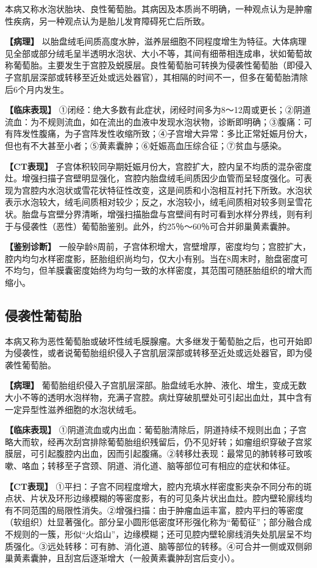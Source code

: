 本病又称水泡状胎块、良性葡萄胎。其病因及本质尚不明确，一种观点认为是肿瘤性疾病，另一种观点认为是胎儿发育障碍死亡后所致。

\textbf{【病理】}
以胎盘绒毛间质高度水肿，滋养层细胞不同程度增生为特征。大体病理见全部或部分绒毛呈半透明水泡状、大小不等，其间有细蒂相连成串，状如葡萄故称葡萄胎。主要发生于宫腔及蜕膜层。良性葡萄胎可转换为侵袭性葡萄胎（即侵入子宫肌层深部或转移至近处或远处器官），其相隔的时间不一，但多在葡萄胎清除后6个月内发生。

\textbf{【临床表现】}
①闭经：绝大多数有此症状，闭经时间多为8～12周或更长；②阴道流血：为不规则流血，如在流出的血液中发现水泡状物，诊断即明确；③腹痛：可有阵发性腹痛，为子宫阵发性收缩所致；④子宫增大异常：多比正常妊娠月份大，但也有不大甚至小者；⑤黄素囊肿；⑥妊娠高血压综合征；⑦贫血与感染。

\textbf{【CT表现】}
子宫体积较同孕期妊娠月份大，宫腔扩大，腔内呈不均质的混杂密度灶。增强扫描子宫壁明显强化，宫腔内胎盘绒毛间质因少血管而呈轻度强化。可表现为宫腔内水泡状或雪花状特征性改变，这是间质和小泡相互衬托下所致。水泡状表示水泡较大，绒毛间质相对较少；反之，水泡较小，绒毛间质相对较多则呈雪花状。胎盘与宫壁分界清晰，增强扫描胎盘与宫壁间有时可看到水样分界线，则有利于与侵袭性（恶性）葡萄胎鉴别。此外，约25％～60％可合并卵巢黄素囊肿。

\textbf{【鉴别诊断】}
一般孕龄8周前，子宫体积增大，宫壁增厚，密度均匀；宫腔扩大，腔内均匀水样密度影，胚胎组织尚均匀，仅大小有别。当在8周末时，胎盘密度可不均匀，但羊膜囊密度始终为均匀一致的水样密度，其范围可随胚胎组织的增大而缩小。

\subsection{侵袭性葡萄胎}

本病又称为恶性葡萄胎或破坏性绒毛膜腺瘤。大多继发于葡萄胎之后，也可开始即为侵袭性，或者说葡萄胎组织侵入子宫肌层深部或转移至近处或远处器官，即为侵袭性葡萄胎。

\textbf{【病理】}
葡萄胎组织侵入子宫肌层深部。胎盘绒毛水肿、液化、增生，变成无数大小不等的透明水泡样物，充满子宫腔。病灶穿破肌壁处可引起出血灶，其中含有一定异型性滋养细胞的水泡状绒毛。

\textbf{【临床表现】}
①阴道流血或内出血：葡萄胎清除后，阴道持续不规则出血；子宫略大而软，经再次刮宫排除葡萄胎组织残留后，仍不见好转；如瘤组织穿破子宫浆膜层，可引起腹腔内出血，因而引起腹痛。②转移灶表现：最常见的肺转移可致咳嗽、咯血；转移至子宫颈、阴道、消化道、脑等部位可有相应的症状和体征。

\textbf{【CT表现】}
①平扫：子宫不同程度增大，腔内充填水样密度影夹杂不同分布的斑点状、片状及环形边缘模糊的等密度影，有的可见条片状出血灶。腔内壁轮廓线均有不同范围的局限性消失。②增强扫描：由于肿瘤血运丰富，腔内平扫的等密度（软组织）灶显著强化。部分呈小圆形低密度环形强化称为“葡萄征”；部分融合成不规则的一簇，形似“火焰山”，边缘模糊；还可见腔内壁轮廓线消失处肌层呈不均质强化。③远处转移：可有肺、消化道、脑等部位的转移。④可合并一侧或双侧卵巢黄素囊肿，且刮宫后逐渐增大（一般黄素囊肿刮宫后变小）。

